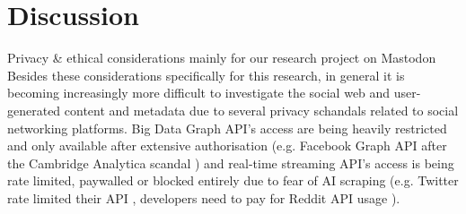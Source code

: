 \section{Discussion}

Privacy \& ethical considerations mainly for our research project on Mastodon \\ 


Besides these considerations specifically for this research, in general it is becoming increasingly more difficult to investigate the social web and user-generated content and metadata due to several privacy schandals related to social networking platforms. Big Data Graph API's access are being heavily restricted and only available after extensive authorisation (e.g. Facebook Graph API after the Cambridge Analytica scandal \cite{cambridge}) and real-time streaming API's access is being rate limited, paywalled or blocked entirely due to fear of AI scraping (e.g. Twitter rate limited their API \cite{twitter}, developers need to pay for Reddit API usage \cite{reddit}).